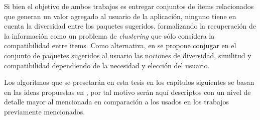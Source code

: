 Si bien el objetivo de ambos trabajos es entregar conjuntos de ítems relacionados que generan un valor agregado al usuario de la aplicación, ninguno tiene en cuenta la diversidad entre los paquetes sugeridos. formalizando la recuperación de la información como un problema de {\em clustering} que sólo considera la compatibilidad entre items. Como alternativa, en \cite{compositeRetrival} se propone conjugar en el conjunto de paquetes sugeridos al usuario las nociones de diversidad, similitud y compatibilidad dependiendo de la necesidad y elección del usuario.

Los algoritmos que se presetarán en esta tesis en los capítulos siguientes se basan en las ideas propuestas en \cite{compositeRetrival}, por tal motivo serán aquí descriptos con un nivel de detalle mayor al mencionada en comparación a los usados en los trabajos previamente mencionados.

